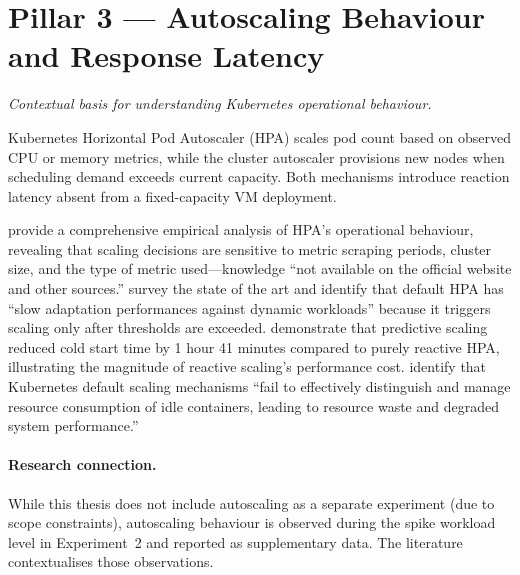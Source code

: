 
\section{Pillar 3 --- Autoscaling Behaviour and Response Latency}
\label{sec:pillar3}

\emph{Contextual basis for understanding Kubernetes operational behaviour.}

Kubernetes Horizontal Pod Autoscaler (HPA) scales pod count based on observed CPU or memory metrics, while the cluster autoscaler provisions new nodes when scheduling demand exceeds current capacity. Both mechanisms introduce reaction latency absent from a fixed-capacity VM deployment.

\citet{nguyen2020} provide a comprehensive empirical analysis of HPA's operational behaviour, revealing that scaling decisions are sensitive to metric scraping periods, cluster size, and the type of metric used---knowledge ``not available on the official website and other sources.'' \citet{tran2022} survey the state of the art and identify that default HPA has ``slow adaptation performances against dynamic workloads'' because it triggers scaling only after thresholds are exceeded. \citet{yuan2024} demonstrate that predictive scaling reduced cold start time by 1 hour 41 minutes compared to purely reactive HPA, illustrating the magnitude of reactive scaling's performance cost. \citet{li2025} identify that Kubernetes default scaling mechanisms ``fail to effectively distinguish and manage resource consumption of idle containers, leading to resource waste and degraded system performance.''

\paragraph{Research connection.}
While this thesis does not include autoscaling as a separate experiment (due to scope constraints), autoscaling behaviour is observed during the spike workload level in Experiment~2 and reported as supplementary data. The literature contextualises those observations.
